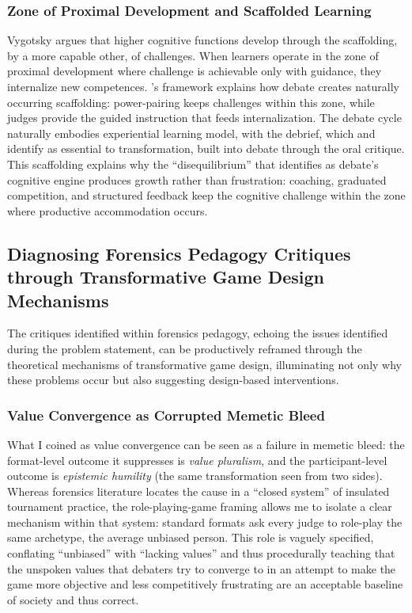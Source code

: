 \subsubsection{Zone of Proximal Development and Scaffolded Learning}

Vygotsky argues that higher cognitive functions develop through the scaffolding, by a more capable other, of challenges. When learners operate in the zone of proximal development where challenge is achievable only with guidance, they internalize new competences. \textcite{vygotsky1978mind}'s framework explains how debate creates naturally occurring scaffolding: power-pairing keeps challenges within this zone, while judges provide the guided instruction that feeds internalization. The debate cycle naturally embodies \textcite{kolb1984experiential} experiential learning model, with the debrief, which \textcite{crookall2014engaging} and \textcite{daniau2016transformative} identify as essential to transformation, built into debate through the oral critique. This scaffolding explains why the ``disequilibrium'' that \textcite{colbert1995enhancing} identifies as debate's cognitive engine produces growth rather than frustration: coaching, graduated competition, and structured feedback keep the cognitive challenge within the zone where productive accommodation occurs.

\subsection{Diagnosing Forensics Pedagogy Critiques through Transformative Game Design Mechanisms}

The critiques identified within forensics pedagogy, echoing the issues identified during the problem statement, can be productively reframed through the theoretical mechanisms of transformative game design, illuminating not only why these problems occur but also suggesting design-based interventions.

\subsubsection{Value Convergence as Corrupted Memetic Bleed}

What I coined as value convergence can be seen as a failure in memetic bleed: the format-level outcome it suppresses is \textit{value pluralism}, and the participant-level outcome is \textit{epistemic humility} (the same transformation seen from two sides). Whereas forensics literature locates the cause in a ``closed system'' of insulated tournament practice, the role-playing-game framing allows me to isolate a clear mechanism within that system: standard formats ask every judge to role-play the same archetype, the average unbiased person. This role is vaguely specified, conflating ``unbiased'' with ``lacking values'' and thus procedurally teaching that the unspoken values that debaters try to converge to in an attempt to make the game more objective and less competitively frustrating are an acceptable baseline of society and thus correct.

